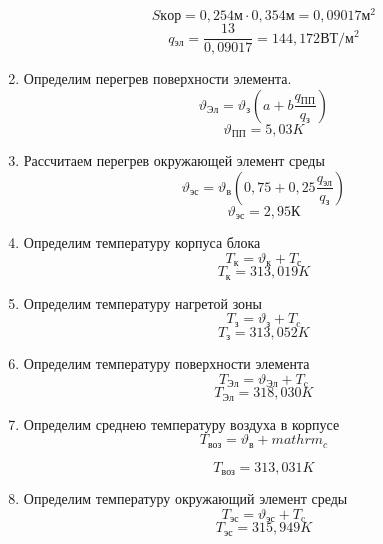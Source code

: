 \begin{enumerate}[label={\arabic*.}]
    $$S\mathrm{кор} = 0,254\mathrm{м} \cdot 0,354\mathrm{м} = 0,09017\mathrm{м^2}$$
    $$q\mathrm{_{эл}} = \frac{13}{0,09017} =144,172\mathrm{ВТ/м^2} $$

  \item Определим перегрев поверхности элемента.
    \begin{equation}
      \vartheta\mathrm{_{Эл}} = \vartheta\mathrm{_{з}}(a + b \frac{q\mathrm{_{ПП}}}{q\mathrm{_{з}}})
    \end{equation}
    $$\vartheta\mathrm{_{ПП}} = 5,03K$$

  \item Рассчитаем перегрев окружающей элемент среды
    \begin{equation}
      \vartheta\mathrm{_{эс}} = \vartheta\mathrm{_в}(0,75 + 0,25\frac{q\mathrm{_{эл}}}{q\mathrm{_{з}}})
    \end{equation}
    $$\vartheta\mathrm{_{эс}} = 2,95К$$
  \item Определим температуру корпуса блока
    \begin{equation}
      T\mathrm{_к} = \vartheta\mathrm{_к} + T\mathrm{_с}
    \end{equation}
    $$T\mathrm{_к} = 313,019K$$
  \item Определим температуру нагретой зоны
    \begin{equation}
      T\mathrm{_з} = \vartheta\mathrm{_з} + T\mathrm{_c}
    \end{equation}
    $$T\mathrm{_з} = 313,052 K$$

  \item Определим температуру поверхности элемента
    \begin{equation}
      T\mathrm{_{Эл}} = \vartheta\mathrm{_{Эл}} + T\mathrm{_c}
    \end{equation}
    $$T\mathrm{_{Эл}} = 318,030 K$$

  \item Определим среднею температуру воздуха в корпусе
    \begin{equation}
      T\mathrm{_{воз}} = \vartheta\mathrm{_в} + mathrm{_c}
    \end{equation}

    $$T\mathrm{_{воз}} =313,031 K$$
  \item Определим температуру окружающий элемент среды
    \begin{equation}
      T\mathrm{_{эс}} = \vartheta\mathrm{_{эс}} + T\mathrm{_c}
    \end{equation}
    $$T\mathrm{_{эс}} = 315,949 K$$
\end{enumerate}


